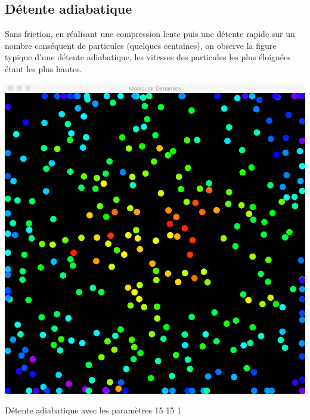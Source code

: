 \documentclass{tufte-handout}
\begin{document}
  \subsection{Détente adiabatique}
  Sans friction, en réalisant une compression lente puis une détente rapide sur un nombre conséquent de particules (quelques centaines), on observe la figure typique d'une détente adiabatique, les vitesses des particules les plus éloignées étant les plus hautes.
  \begin{marginfigure}
    \includegraphics[width=\linewidth]{figures/adiabaticwithoutfriction.png}
    \caption{Détente adiabatique avec les paramètres 15 15 1}
  \end{marginfigure}
\end{document}
